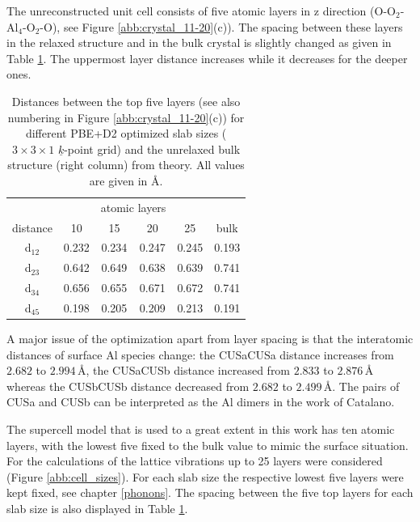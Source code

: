 \documentclass[11pt,DIV=13,BCOR=5mm,a4paper,headinclude]{scrbook}
\renewcommand{\vec}[1]{\underline{#1}}
\begin{document}
The unreconstructed unit cell consists of five atomic layers in z direction (O-O$_2$-Al$_4$-O$_2$-O), see Figure \ref{abb:crystal_11-20}(c)).
The spacing between these layers in the relaxed structure and in the bulk crystal is slightly changed as given in Table \ref{tab:layer-dist}.
The uppermost layer distance increases while it decreases for the deeper ones.
\begin{table}[!ht]
  \centering
 \caption{Distances between the top five layers (see also numbering in Figure \ref{abb:crystal_11-20}(c)) for different PBE+D2 optimized slab sizes ($3\times 3\times 1$ $\vec{k}$-point grid) and the unrelaxed bulk structure (right column) from theory.
All values are given in \AA.} 
\vspace*{.2cm}
\begin{tabular}{c|cccc|c}
\toprule
 & &\multicolumn{2}{c}{atomic layers}&&\\
    distance    & 10   & 15   & 20   & 25   &bulk \\\midrule
 d$_{12}$	&0.232 &0.234 &0.247 &0.245 &0.193 \\
 d$_{23}$	&0.642 &0.649 &0.638 &0.639 &0.741 \\
 d$_{34}$	&0.656 &0.655 &0.671 &0.672 &0.741 \\
 d$_{45}$	&0.198 &0.205 &0.209 &0.213 &0.191 \\\bottomrule
  \end{tabular}
  \label{tab:layer-dist}
\end{table}
A major issue of the optimization apart from layer spacing is that the interatomic distances of surface Al species change: the CUSa\textendash CUSa distance increases from $2.682$ to $2.994\,$\AA{}, the CUSa\textendash CUSb distance increased from $2.833$ to $2.876\,$\AA{} whereas the CUSb\textendash CUSb distance decreased from $2.682$ to $2.499\,$\AA{}.
The pairs of CUSa and CUSb can be interpreted as the Al dimers in the work of Catalano\cite{catalano}.


The supercell model that is used to a great extent in this work has ten atomic layers, with the lowest five fixed to the bulk value to mimic the surface situation.
For the calculations of the lattice vibrations up to 25 layers were considered (Figure \ref{abb:cell_sizes}).
For each slab size the respective lowest five layers were kept fixed, see chapter \ref{phonons}.
The spacing between the five top layers for each slab size is also displayed in Table \ref{tab:layer-dist}.
\end{document}
